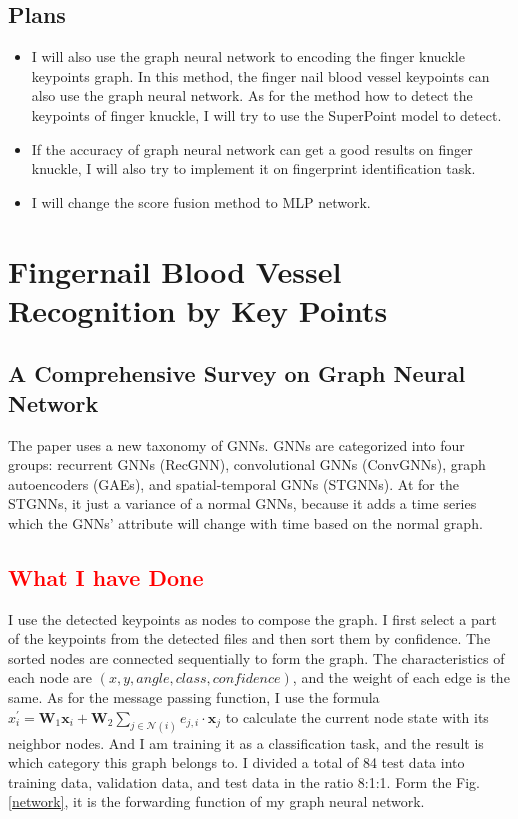 \subsection{Plans}
\begin{itemize}
    \item I will also use the graph neural network to encoding the finger knuckle keypoints graph. In this method, the finger nail blood vessel keypoints can also use the graph neural network. As for the method how to detect the keypoints of finger knuckle, I will try to use the SuperPoint \cite{detone2018superpoint} model to detect.
    \item  If the accuracy of graph neural network can get a good results on finger knuckle, I will also try to implement it on fingerprint identification task.
    \item I will change the score fusion method to MLP network.
\end{itemize} 


\section{Fingernail Blood Vessel Recognition by Key Points}

\subsection{A Comprehensive Survey on Graph Neural Network \cite{wu2020comprehensive}}

The paper uses a new taxonomy of GNNs. GNNs are categorized into four groups: recurrent GNNs (RecGNN), convolutional GNNs (ConvGNNs), graph autoencoders (GAEs), and spatial-temporal GNNs (STGNNs). At for the STGNNs, it just a variance of a normal GNNs, because it adds a time series which the GNNs' attribute will change with time based on the normal graph.

\textcolor{red}{\subsection{What I have Done}}
I use the detected keypoints as nodes to compose the graph. I first select a part of the keypoints from the detected files and then sort them by confidence. The sorted nodes are connected sequentially to form the graph. The characteristics of each node are $(x, y, angle, class, confidence)$, and the weight of each edge is the same. As for the message passing function, I use the formula ${x}^{\prime}_i = \mathbf{W}_1 \mathbf{x}_i + \mathbf{W}_2\sum_{j \in \mathcal{N}(i)} e_{j,i} \cdot \mathbf{x}_j$ to calculate the current node state with its neighbor nodes. And I am training it as a classification task, and the result is which category this graph belongs to. I divided a total of 84 test data into training data, validation data, and test data in the ratio 8:1:1. Form the Fig. \ref{network}, it is the forwarding function of my graph neural network.

